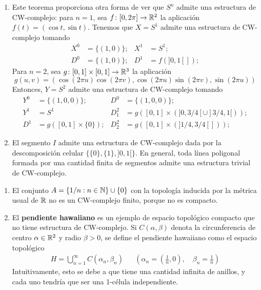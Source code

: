 \begin{example}
\begin{enumerate}
\item Este teorema proporciona otra forma de ver que $S^n$ admite una
estructura de CW-complejo: para $n=1$, sea $f\colon [0,2\pi] \to \mathbb{R}^2$ la
aplicación $f(t)=(\cos t,\sin t)$. Tenemos que $X=S^1$ admite una estructura
de CW-complejo tomando
\begin{align*}
X^0&=\{(1,0)\}; 	& X^1&=S^1;\\
D^0&=\{(1,0)\}; 	& D^1&=f(]0,1[]);
\end{align*}
Para $n=2$, sea $g\colon [0,1]\times [0,1] \to \mathbb{R}^3$ la aplicación
\[g(u,v)=(\cos(2\pi u)\cos(2\pi v),\cos(2\pi u)\sin(2\pi v),\sin(2\pi u))\]
Entonces, $Y=S^2$ admite una estructura de CW-complejo tomando
\begin{align*}
Y^0		&=\{(1,0,0)\}; 	& D^0&=\{(1,0,0)\};\\
Y^1 	&=S^1 			&
D^2_1	&=g([0,1]\times(]0,3/4[\cup]3/4,1[));\\
D^1 	&=g([0,1]\times\{0\});	&
D^2_2	&=g([0,1]\times(]1/4,3/4[]));
\end{align*}
\item El segmento $I$ admite una estructura de CW-complejo dada por la descomposición celular $\{\{0\},\{1\},]0,1[\}$.
En general, toda línea poligonal formada por una cantidad finita de segmentos admite una estructura trivial de CW-complejo.
\end{enumerate}
\end{example}

\begin{example}
\begin{enumerate}
\item El conjunto $A=\{1/n: n \in \mathbb{N}\}\cup \{0\}$ con la topología
inducida por la métrica usual de $\mathbb{R}$ no es un CW-complejo finito, porque
no es compacto.

\item El \textbf{pendiente hawaiiano} es un ejemplo de espacio topológico
compacto que no tiene estructura de CW-complejo. Si $C(\alpha,\beta)$ denota
la circunferencia de centro $\alpha \in \mathbb{R}^2$ y radio $\beta > 0$, se
define el pendiente hawaiiano como el espacio topológico
\begin{align*}
H=\bigcup_{n=1}^\infty C(\alpha_n,\beta_n) &&
\left(\alpha_n=\left(\frac{1}{n},0\right), \quad 
\beta_n=\frac{1}{n}\right)
\end{align*}
Intuitivamente, esto se debe a que tiene una cantidad infinita de anillos, y
cada uno tendría que ser una 1-célula independiente.
\end{enumerate}
\end{example}

